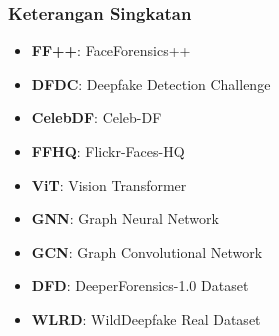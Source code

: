 \subsubsection{Keterangan Singkatan}
\begin{itemize}
    \item \textbf{FF++}: FaceForensics++
    \item \textbf{DFDC}: Deepfake Detection Challenge
    \item \textbf{CelebDF}: Celeb-DF
    \item \textbf{FFHQ}: Flickr-Faces-HQ
    \item \textbf{ViT}: Vision Transformer
    \item \textbf{GNN}: Graph Neural Network
    \item \textbf{GCN}: Graph Convolutional Network
    \item \textbf{DFD}: DeeperForensics-1.0 Dataset
    \item \textbf{WLRD}: WildDeepfake Real Dataset
\end{itemize}

\clearpage